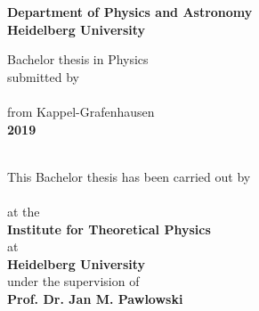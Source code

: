 {\hypersetup{allcolors=black}
\begin{titlepage}

	\begin{center}
		\makeatletter
		\vspace{2cm}
		\Large\textbf{Department of Physics and Astronomy\\
			Heidelberg University}
		
		\vfill
		\normalsize
		Bachelor thesis in Physics\\
		\normalsize
		submitted by\\[0.4cm]
		\Large
		\textbf{\@author}\\[0.4cm]
		\normalsize
		from Kappel-Grafenhausen \\ [0.4cm]
		\Large\textbf{2019}

		\cleardoublepage
		\thispagestyle{empty}
		\LARGE\textbf{\@title}\\[.4cm]

		\vfill
		\normalsize
		This Bachelor thesis has been carried out by \\ 
		\vspace{3pt}
		\textbf{\@author}  \\ 
		\vspace{3pt}
		at the\\
		\vspace{3pt}
		\textbf{Institute for Theoretical Physics} \\ at \\\textbf{Heidelberg University}\\
		\vspace{5pt}
		under the supervision of\\
		\vspace{5pt}
		\textbf{Prof. Dr. Jan M. Pawlowski}
		
		\makeatother
	\end{center}
\cleardoublepage
\end{titlepage}}